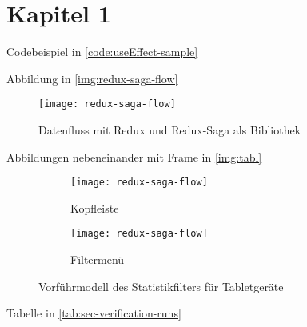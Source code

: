 \section{Kapitel 1}
Codebeispiel in \autoref{code:useEffect-sample}


Abbildung in \autoref{img:redux-saga-flow}

\begin{figure}[H]
	\centering
	\texttt{[image: redux-saga-flow]}
	\caption{Datenfluss mit Redux und Redux-Saga als Bibliothek}
	\label{img:redux-saga-flow}
\end{figure}

Abbildungen nebeneinander mit Frame in \autoref{img:tabl}

\begin{figure}[H]
	\centering
	\begin{subfigure}[b]{.45\textwidth}
		\centering
		\texttt{[image: redux-saga-flow]}
		\caption{Kopfleiste}
		\label{img:tablet-head}
	\end{subfigure}
	\begin{subfigure}[b]{.45\textwidth}
		\centering
		\texttt{[image: redux-saga-flow]}
		\caption{Filtermenü}
		\label{img:tablet}
	\end{subfigure}
	\caption{Vorführmodell des Statistikfilters für Tabletgeräte}
	\label{img:tabl}
\end{figure}

Tabelle in \autoref{tab:sec-verification-runs}

